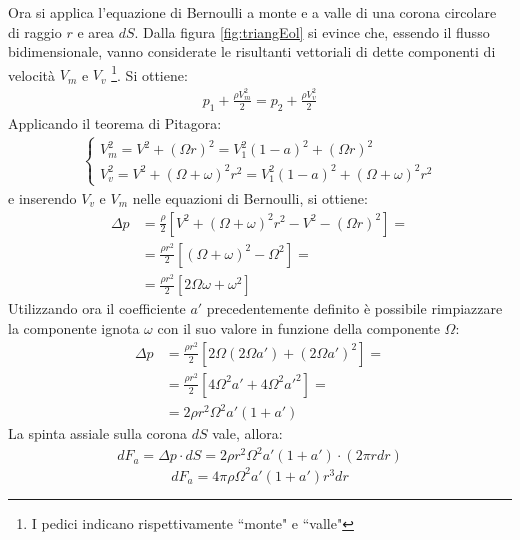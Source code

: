 Ora si applica l'equazione di Bernoulli a monte e a valle di una corona circolare di raggio $r$ e area $dS$. Dalla figura \ref{fig:triangEol} si evince che, essendo il flusso bidimensionale, vanno considerate le risultanti vettoriali di dette componenti di velocità $V_m$ e $V_v$ \footnote{I pedici indicano rispettivamente ``monte" e ``valle"}. Si ottiene:
\begin{align*}
p_1 + \frac{\rho V_m^2}{2} = p_2 + \frac{\rho V_v^2}{2}
\end{align*}
Applicando il teorema di Pitagora:
\begin{align*}
\begin{cases}
V_m^2 = V^2 + \left( \Omega r \right)^2 = V_1^2 \left(1-a \right)^2 + \left( \Omega r \right)^2\\
V_v^2 = V^2 + \left( \Omega + \omega \right)^2 r^2= V_1^2 \left(1-a \right)^2 + \left( \Omega + \omega \right)^2 r^2
\end{cases}
\end{align*}
e inserendo $V_v$ e $V_m$ nelle equazioni di Bernoulli, si ottiene:
\begin{align*}
\Delta p & =\frac{\rho}{2} \left[ V^2 + \left( \Omega + \omega \right)^2 r^2 - V^2 - \left( \Omega r \right)^2 \right]=\\
& =\frac{\rho r^2}{2} \left[ \left( \Omega + \omega \right)^2 - \Omega^2 \right]= \\
& =\frac{\rho r^2}{2} \left[ 2 \Omega \omega + \omega^2 \right]
\end{align*}
Utilizzando ora il coefficiente $a'$ precedentemente definito è possibile rimpiazzare la componente ignota $\omega$ con il suo valore in funzione della componente $\Omega$:
\begin{align*}
\Delta p &= \frac{\rho r^2}{2} \left[ 2 \Omega \left( 2 \Omega a'\right) + \left( 2 \Omega a' \right)^2 \right]=\\
&= \frac{\rho r^2}{2} \left[ 4 \Omega^2 a' + 4 \Omega^2 a'^2 \right] = \\
&= 2 \rho r^2 \Omega^2 a' \left( 1+a' \right)
\end{align*}
La spinta assiale sulla corona $dS$ vale, allora:
\begin{align*}
dF_a = \Delta p \cdot dS = 2 \rho r^2 \Omega^2 a' \left(1 + a' \right) \cdot \left( 2 \pi r dr \right)
\end{align*}
\begin{equation}\label{eq:forza2}
dF_a = 4 \pi \rho \Omega^2 a' \left( 1+ a' \right) r^3 dr
\end{equation}

